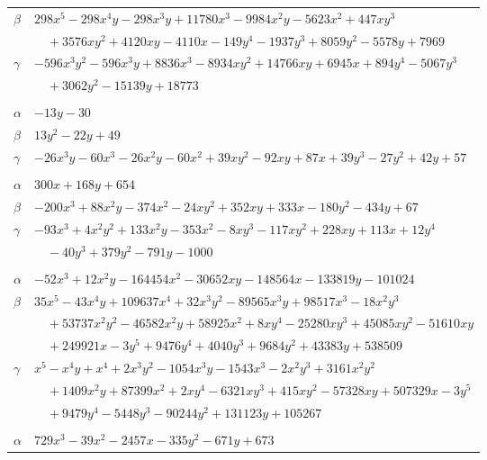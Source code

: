 \documentclass[11pt]{article}
\begin{document}
\begin{longtable}{@{}ll@{}}
$\beta$ & $298x^{5}-298x^{4}y-298x^{3}y+11780x^{3}-9984x^{2}y-5623x^{2}+447xy^{3}$\\
 & $\quad +3576xy^{2}+4120xy-4110x-149y^{4}-1937y^{3}+8059y^{2}-5578y+7969$\\
$\gamma$ & $-596x^{3}y^{2}-596x^{3}y+8836x^{3}-8934xy^{2}+14766xy+6945x+894y^{4}-5067y^{3}$\\
 & $\quad +3062y^{2}-15139y+18773$\\
\addlinespace[3pt]
\multicolumn{2}{@{}l}{$\{i,j\}=\{2,57\}$, $k_{ij}=2^{4}$}\\
$\alpha$ & $-13y-30$\\
$\beta$ & $13y^{2}-22y+49$\\
$\gamma$ & $-26x^{3}y-60x^{3}-26x^{2}y-60x^{2}+39xy^{2}-92xy+87x+39y^{3}-27y^{2}+42y+57$\\
\addlinespace[3pt]
\multicolumn{2}{@{}l}{$\{i,j\}=\{2,82\}$, $k_{ij}=3\cdot 7^{3}$}\\
$\alpha$ & $300x+168y+654$\\
$\beta$ & $-200x^{3}+88x^{2}y-374x^{2}-24xy^{2}+352xy+333x-180y^{2}-434y+67$\\
$\gamma$ & $-93x^{3}+4x^{2}y^{2}+133x^{2}y-353x^{2}-8xy^{3}-117xy^{2}+228xy+113x+12y^{4}$\\
 & $\quad -40y^{3}+379y^{2}-791y-1000$\\
\addlinespace[3pt]
\multicolumn{2}{@{}l}{$\{i,j\}=\{2,89\}$, $k_{ij}=2^{5}\cdot 3^{2}\cdot 7\cdot 13^{2}$}\\
$\alpha$ & $-52x^{3}+12x^{2}y-164454x^{2}-30652xy-148564x-133819y-101024$\\
$\beta$ & $35x^{5}-43x^{4}y+109637x^{4}+32x^{3}y^{2}-89565x^{3}y+98517x^{3}-18x^{2}y^{3}$\\
 & $\quad +53737x^{2}y^{2}-46582x^{2}y+58925x^{2}+8xy^{4}-25280xy^{3}+45085xy^{2}-51610xy$\\
 & $\quad +249921x-3y^{5}+9476y^{4}+4040y^{3}+9684y^{2}+43383y+538509$\\
$\gamma$ & $x^{5}-x^{4}y+x^{4}+2x^{3}y^{2}-1054x^{3}y-1543x^{3}-2x^{2}y^{3}+3161x^{2}y^{2}$\\
 & $\quad +1409x^{2}y+87399x^{2}+2xy^{4}-6321xy^{3}+415xy^{2}-57328xy+507329x-3y^{5}$\\
 & $\quad +9479y^{4}-5448y^{3}-90244y^{2}+131123y+105267$\\
\addlinespace[3pt]
\multicolumn{2}{@{}l}{$\{i,j\}=\{2,90\}$, $k_{ij}=2^{4}\cdot 3\cdot 7\cdot 13$}\\
$\alpha$ & $729x^{3}-39x^{2}-2457x-335y^{2}-671y+673$\\

\end{longtable}
\end{document}
